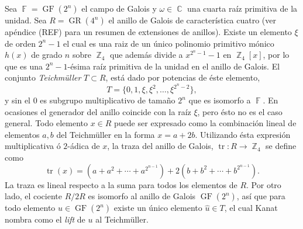 \documentclass[a4paper]{report}
\DeclareMathOperator{\C}{\mathbb{C}}
\DeclareMathOperator{\Z}{\mathbb{Z}}
\DeclareMathOperator{\F}{\mathbb{F}}
\DeclareMathOperator{\tr}{tr}
\DeclareMathOperator{\GF}{GF}
\DeclareMathOperator{\GR}{GR}
\begin{document}
  Sea $\F = \GF(2^{n})$ el campo de Galois y $\omega \in \C$
  una cuarta raíz primitiva de la unidad. Sea $R =
  \GR(4^{n})$ el anillo de Galois de característica cuatro
  (ver apéndice (REF) para un resumen de extensiones de
  anillos). Existe un elemento $\xi$ de orden $2^{n}-1$ el
  cual es una raiz de un único polinomio primitivo mónico
  $h(x)$ de grado $n$ sobre $\Z_4$ que además divide a
  $x^{2^{n}-1} - 1$ en $\Z_4[x]$, por lo que es una
  $2^{n}-1$-ésima raíz primitiva de la unidad en el anillo
  de Galois. El conjunto \textit{Teichmüller} $T \subset R$,
  está dado por potencias de éste elemento,
  \begin{equation}
    T = \{0,1,\xi,\xi^2,\ldots,\xi^{2^{n}-2}\},
  \end{equation}
  y sin el $0$ es subgrupo multiplicativo de tamaño $2^{n}$
  que es isomorfo a $\F$. En ocasiones el generador del
  anillo coincide con la raíz $\xi$, pero ésto no es el caso
  general. Todo elemento $x \in R$ puede ser expresado como
  la combinación lineal de elementos $a,b$ del Teichmüller
  en la forma $x = a + 2b$.  Utilizando ésta expresión
  multiplicativa ó $2$-ádica de $x$, la traza del anillo de
  Galois, $\tr : R \to \Z_4$ se define como
  \begin{equation}
    \tr(x)
    = \left(a + a^2 + \cdots + a^{2^{n-1}}\right) + 2\left(
    b + b^2 + \cdots + b^{2^{n-1}}\right).
  \end{equation}
  La traza es lineal respecto a la suma para todos los
  elementos de $R$. Por otro lado, el cociente $R / 2R$ es
  isomorfo al anillo de Galois $\GF(2^{n})$, así que para
  todo elemento $u \in \GF(2^{n})$ existe un único elemento
  $\hat u \in T$, el cual Kanat nombra como el \textit{lift}
  de $u$ al Teichmüller. 
\end{document}
